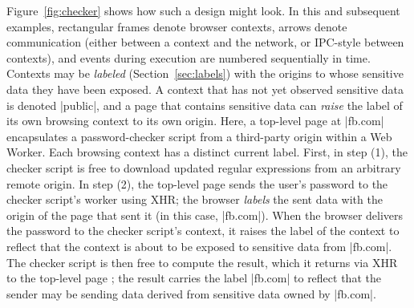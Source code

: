 Figure~\ref{fig:checker} shows how such a design might look. In this
and subsequent examples, rectangular frames denote browser contexts,
arrows denote communication (either between a context and the network,
or IPC-style between contexts), and events during execution are
numbered sequentially in time. Contexts may be \emph{labeled} (Section~\ref{sec:labels}) with the
origins to whose sensitive data they have been exposed. A context that
has not yet observed sensitive data is denoted \js|public|, and a page
that contains sensitive data can \emph{raise} the label of its own
browsing context to its own origin. Here, a top-level page at
\js|fb.com| encapsulates a password-checker script from a third-party
origin within a Web Worker. Each browsing context has a
distinct current label. First, in step (1), the checker script is free
to download updated regular expressions from an arbitrary remote
origin. In step (2), the top-level page sends the user's password to
the checker script's worker using XHR\@ {}; the browser \emph{labels} the
sent data with the origin of the page that sent it (in this case,
\js|fb.com|). When the browser delivers the password to the checker
script's context, it raises the label of the context to reflect that
the context is about to be exposed to sensitive data from \js|fb.com|. 
 The checker script is then
free to compute the result, which it returns via XHR to the top-level
page ; the result carries the label \js|fb.com| to reflect that the
sender may be sending data derived from sensitive data owned by
\js|fb.com|.

